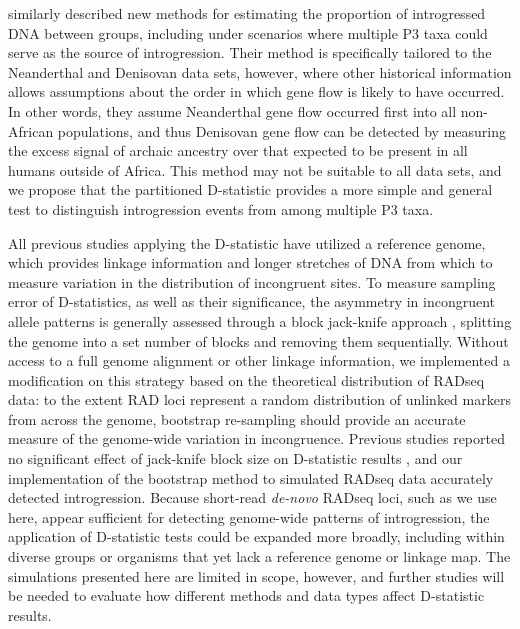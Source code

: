 \documentclass[12pt,letterpaper]{article}
\begin{document}
\cite{meyer_high-coverage_2012} similarly described new methods
for estimating the proportion of introgressed DNA
between groups, including under scenarios where multiple P3 taxa
could serve as the source of introgression. 
Their method is specifically tailored to the Neanderthal 
and Denisovan data sets, however, where other historical information
allows assumptions about the order in which gene flow is likely 
to have occurred. In other words, they assume Neanderthal gene flow
occurred first into all non-African populations, and thus Denisovan 
gene flow can be detected by measuring the excess signal of 
archaic ancestry over that expected to be present in all 
humans outside of Africa. This method may not be 
suitable to all data sets, and we propose that the partitioned 
D-statistic provides a more simple and general test to distinguish 
introgression events from among multiple P3 taxa. 

All previous studies applying the D-statistic have
utilized a reference genome, which provides linkage information and 
longer stretches of DNA from which to measure
variation in the distribution of incongruent sites. 
To measure sampling error of D-statistics, as well as their 
significance, the asymmetry in incongruent allele patterns 
is generally assessed through a block jack-knife 
approach \citep{green_draft_2010}, splitting the genome 
into a set number of blocks and removing 
them sequentially. Without access to a full genome alignment
or other linkage information, we implemented a
modification on this strategy based on the theoretical distribution
of RADseq data: to the extent RAD loci represent a random distribution
of unlinked markers from across the genome, bootstrap
re-sampling should provide an accurate measure of the
genome-wide variation in incongruence. Previous studies reported 
no significant effect of jack-knife block size on D-statistic results
\citep{meyer_high-coverage_2012}, and our implementation of the
bootstrap method to simulated RADseq data accurately
detected introgression. Because short-read
\emph{de-novo} RADseq loci, such as we use here, 
appear sufficient for detecting genome-wide patterns of 
introgression, the application of D-statistic tests could
be expanded more broadly, including within diverse groups 
or organisms that yet lack a reference genome or linkage map. 
The simulations presented here are limited in scope,
however, and further studies will be needed to evaluate how different 
methods and data types affect D-statistic results.
\end{document}
